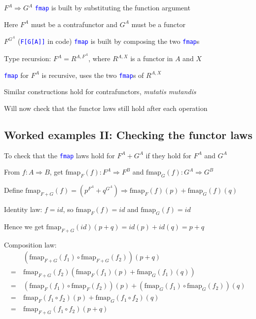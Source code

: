 $F^{A}\Rightarrow G^{A}$ \textendash{} \texttt{\textcolor{blue}{\footnotesize{}fmap}}
is built by substituting the function argument

Here $F^{A}$ must be a contrafunctor and $G^{A}$ must be a functor

$F^{G^{A}}$ (\texttt{\textcolor{blue}{\footnotesize{}F{[}G{[}A{]}{]}}}
in code) \textendash{} \texttt{\textcolor{blue}{\footnotesize{}fmap}}
is built by composing the two \texttt{\textcolor{blue}{\footnotesize{}fmap}}s

Type recursion: $F^{A}=R^{A,F^{A}}$, where $R^{A,X}$ is a functor
in $A$ and $X$

\texttt{\textcolor{blue}{\footnotesize{}fmap}} for $F^{A}$ is recursive,
uses the two \texttt{\textcolor{blue}{\footnotesize{}fmap}}s of $R^{A,X}$

Similar constructions hold for contrafunctors, \emph{mutatis mutandis}

Will now check that the functor laws still hold after each operation


\subsection{Worked examples II: Checking the functor laws}

To check that the \texttt{\textcolor{blue}{\footnotesize{}fmap}} laws
hold for $F^{A}+G^{A}$ if they hold for $F^{A}$ and $G^{A}$

From $f:A\Rightarrow B$, get $\text{fmap}_{F}(f):F^{A}\Rightarrow F^{B}$
and $\text{fmap}_{G}(f):G^{A}\Rightarrow G^{B}$

Define $\text{fmap}_{F+G}(f)=(p^{F^{A}}+q^{G^{A}})\Rightarrow\text{fmap}_{F}(f)(p)+\text{fmap}_{G}(f)(q)$

Identity law: $f=id$, so $\text{fmap}_{F}(f)=id$ and $\text{fmap}_{G}(f)=id$

Hence we get $\text{fmap}_{F+G}(id)(p+q)=id(p)+id(q)=p+q$

Composition law: 
\begin{align*}
 & (\text{fmap}_{F+G}(f_{1})\circ\text{fmap}_{F+G}(f_{2}))(p+q)\\
=\  & \text{fmap}_{F+G}(f_{2})\left(\text{fmap}_{F}(f_{1})(p)+\text{fmap}_{G}(f_{1})(q)\right)\\
=\  & (\text{fmap}_{F}(f_{1})\circ\text{fmap}_{F}(f_{2}))(p)+\left(\text{fmap}_{G}(f_{1})\circ\text{fmap}_{G}(f_{2})\right)(q)\\
=\  & \text{fmap}_{F}(f_{1}\circ f_{2})(p)+\text{fmap}_{G}(f_{1}\circ f_{2})(q)\\
=\  & \text{fmap}_{F+G}(f_{1}\circ f_{2})(p+q)
\end{align*}

